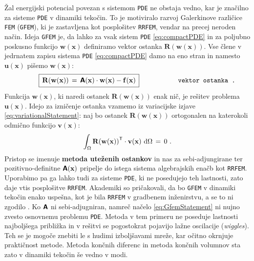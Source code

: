 Žal energijski potencial povezan s sistemom \texttt{PDE} ne obstaja vedno, kar je značilno za sisteme \texttt{PDE} v dinamiki tekočin. To je motiviralo razvoj Galerkinove različice \texttt{FEM} (\texttt{GFEM}), ki je zastavljena kot posplošitev \texttt{RRFEM}, vendar na precej neroden način. Ideja \texttt{GFEM} je, da lahko za vsak sistem \texttt{PDE} \eqref{eq:compactPDE} in za poljubno poskusno funkcijo $\mathbf{w(x)}$ definiramo vektor ostanka $\mathbf{R(w(x))}$. Vse člene v jedrnatem zapisu sistema \texttt{PDE} \eqref{eq:compactPDE} damo na eno stran in namesto $\mathbf{u(x)}$ pišemo $\mathbf{w(x)}$:
\begin{equation}
	\hspace{10mm} \boxed{\, \vphantom{\big(}
		\mathbf{R(w(x))} \, = \, \mathbsf{A}(\mathbf{x}) \cdot \mathbf{w(x)} - \mathbf{f(x)} \,
	}\hspace{20mm} \texttt{vektor ostanka .}
	\label{eq:residual}
\end{equation}
Funkcija $\mathbf{w(x)}$, ki naredi ostanek $\mathbf{R(w(x))}$ enak nič, je rešitev problema $\mathbf{u(x)}$. Idejo za izničenje ostanka vzamemo iz variacijske izjave \eqref{eq:variationalStatement}: naj bo ostanek $\mathbf{R(w(x))}$ ortogonalen na katerokoli odmično funkcijo $\mathbf{v(x)}$:
\begin{equation}
	\int_{\Omega} \mathbf{R(w(x))}^\mathsf{T} \cdot \mathbf{v(x)} \ \mathrm{d} \Omega \, = \, 0 \ .
	\label{eq:GfemStatement}
\end{equation}
Pristop se imenuje \textbf{metoda uteženih ostankov} in nas za sebi-adjungirane ter pozitivno-definitne $\bm{\mathsf{A}}\mathbf{(x)}$ pripelje do istega sistema algebrajskih enačb kot \texttt{RRFEM}. Uporabimo pa ga lahko tudi za sisteme \texttt{PDE}, ki ne posedujejo teh lastnosti, zato daje vtis posplošitve \texttt{RRFEM}. Akademiki so pričakovali, da bo \texttt{GFEM} v dinamiki tekočin enako uspešna, kot je bila \texttt{RRFEM} v gradbenem inženirstvu, a se to ni zgodilo \cite{JiangB-LSFEM}. Ko $\bm{\mathsf{A}}$ ni sebi-adjugniran, namreč načelo \eqref{eq:GfemStatement} ni nujno zvesto osnovnemu problemu \texttt{PDE}. Metoda v tem primeru ne poseduje lastnosti najboljšega približka in v rešitvi se pogostokrat pojavijo lažne oscilacije (\emph{wiggles}). Teh se je mogoče znebiti le s hudimi izboljšavami mreže, kar očitno okrnjuje praktičnost metode. Metoda končnih diferenc in metoda končnih volumnov sta zato v dinamiki tekočin še vedno v modi.

